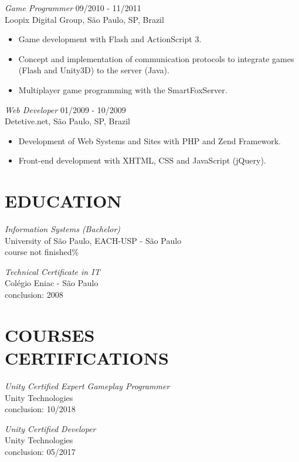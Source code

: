 \documentclass[line,margin]{res}
\begin{document}
\begin{resume}
                {\sl Game Programmer} \hfill 09/2010 - 11/2011 \\
                Loopix Digital Group, São Paulo, SP, Brazil
                 \begin{itemize}  \itemsep 1.25pt
                 \item Game development with Flash and ActionScript 3.
                 \item Concept and implementation of communication protocols to integrate games (Flash and Unity3D) to the server (Java).
                 \item Multiplayer game programming with the SmartFoxServer.
                 \end{itemize}
 
                {\sl Web Developer} \hfill 01/2009 - 10/2009 \\
                Detetive.net, São Paulo, SP, Brazil
                 \begin{itemize}  \itemsep 1.25pt
                 \item Development of Web Systems and Sites with PHP and Zend Framework.
                 \item Front-end development with XHTML, CSS and JavaScript (jQuery).
                 \end{itemize} 

\section{EDUCATION} {\sl Information Systems (Bachelor)} \\
                University of São Paulo, EACH-USP - São Paulo \\
                course not finished\%
		
			{\sl Technical Certificate in IT} \\
	            Colégio Eniac - São Paulo \\
	            conclusion: 2008
                
\section{COURSES \\ CERTIFICATIONS}   
           {\sl Unity Certified Expert Gameplay Programmer } \\
                Unity Technologies \\
			    conclusion: 10/2018

           {\sl Unity Certified Developer } \\
                Unity Technologies \\
			    conclusion: 05/2017
			

\end{resume}
\end{document}
